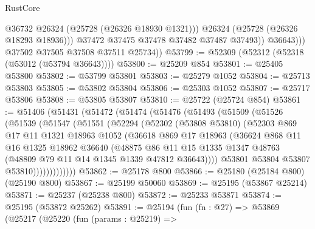 \begin{lexlean}{RustCore}
\begin{coremodule}
                      @36732
                      @26324
                      (@25728 (@26326 @18930 @1321)))
                    @26324
                    (@25728 (@26326 @18293 @18936)))
                  @37472
                  @37475
                  @37478
                  @37482
                  @37487
                  @37493))
              @36643)))
        @37502
        @37505
        @37508
        @37511
        @25734))
@53799 := @52309 (@52312 (@52318 (@53012 (@53794 @36643))))
@53800 := @25209 @854
@53801 := @25405 @53800
@53802 := @53799 @53801
@53803 := @25279 @1052
@53804 := @25713 @53803
@53805 := @53802 @53804
@53806 := @25303 @1052
@53807 := @25717 @53806
@53808 := @53805 @53807
@53810 := @25722 (@25724 @854)
@53861 := @51406
    (@51431
      (@51472
        (@51474
          (@51476
            (@51493
              (@51509
                (@51526
                  (@51539
                    (@51547
                      (@51551
                        (@52294
                          (@52302
                            (@53808 @53810)
                            (@52303
                              @869
                              @17
                              @11
                              @1321
                              @18963
                              @1052
                              (@36618
                                @869
                                @17
                                @18963
                                (@36624
                                  @868
                                  @11
                                  @16
                                  @1325
                                  @18962
                                  @36640
                                  (@48875
                                    @86
                                    @11
                                    @15
                                    @1335
                                    @1347
                                    @48763
                                    (@48809 @79 @11 @14 @1345 @1339 @47812 @36643))))
                              @53801
                              @53804
                              @53807
                              @53810)))))))))))))
@53862 := @25178 @800
@53866 := @25180 (@25184 @800) (@25190 @800)
@53867 := @25199 @50060
@53869 := @25195 (@53867 @25214)
@53871 := @25237 (@25238 @800)
@53872 := @25233 @53871
@53874 := @25195 (@53872 @25262)
@53891 := @25194
    (fun (fn : @27) =>
    @53869
      (@25217
        (@25220
          (fun (params : @25219) =>

\end{coremodule}
\end{lexlean}
